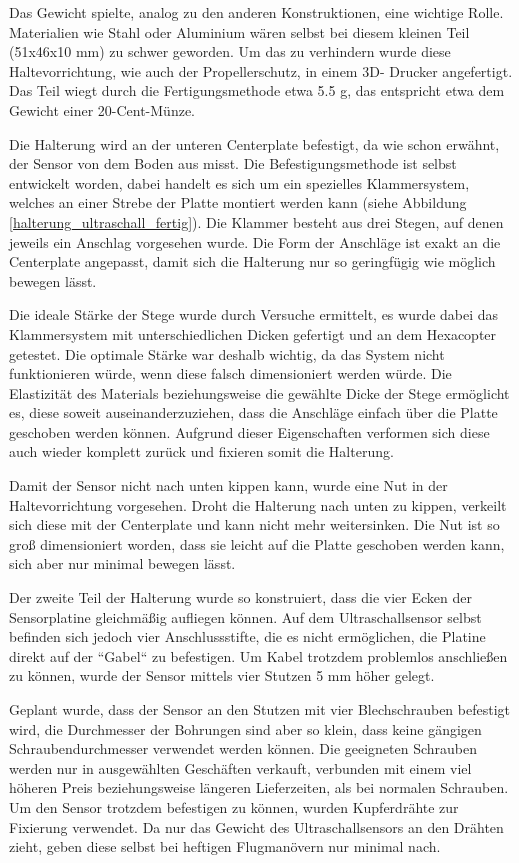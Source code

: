 	Das Gewicht spielte, analog zu den anderen Konstruktionen, eine wichtige Rolle.
	Materialien wie Stahl oder Aluminium wären selbst bei diesem kleinen Teil (51x46x10 mm) zu schwer geworden.
	Um das zu verhindern wurde diese Haltevorrichtung, wie auch der Propellerschutz, in einem 3D- Drucker angefertigt.
	Das Teil wiegt durch die Fertigungsmethode etwa 5.5 g, das entspricht etwa dem Gewicht einer 20-Cent-Münze.

			\newpage

	Die Halterung wird an der unteren Centerplate befestigt, da wie schon erwähnt, der Sensor von dem Boden aus misst.
	Die Befestigungsmethode ist selbst entwickelt worden, dabei handelt es sich um ein spezielles Klammersystem, welches an einer Strebe der Platte montiert werden kann (siehe Abbildung \ref{halterung_ultraschall_fertig}).
	Die Klammer besteht aus drei Stegen, auf denen jeweils ein Anschlag vorgesehen wurde.
	Die Form der Anschläge ist  exakt an die Centerplate angepasst, damit sich die Halterung nur so geringfügig wie möglich bewegen lässt.

	Die ideale Stärke der Stege wurde durch Versuche ermittelt, es wurde dabei das Klammersystem mit unterschiedlichen Dicken gefertigt und an dem Hexacopter getestet.
	Die optimale Stärke war deshalb wichtig, da das System nicht funktionieren würde, wenn diese falsch dimensioniert werden würde.
	Die Elastizität des Materials beziehungsweise die gewählte Dicke der Stege ermöglicht es, diese soweit auseinanderzuziehen, dass die Anschläge einfach über die Platte geschoben werden können.
	Aufgrund dieser Eigenschaften verformen sich diese auch wieder komplett zurück und fixieren somit die Halterung.

	Damit der Sensor nicht nach unten kippen kann, wurde eine Nut in der Haltevorrichtung vorgesehen.
	Droht die Halterung nach unten zu kippen, verkeilt sich diese mit der Centerplate und kann nicht mehr weitersinken.
	Die Nut ist so groß dimensioniert worden, dass sie leicht auf die Platte geschoben werden kann, sich aber nur minimal bewegen lässt.

	Der zweite Teil der Halterung wurde so konstruiert, dass die vier Ecken der Sensorplatine gleichmäßig aufliegen können.
	Auf dem Ultraschallsensor selbst befinden sich jedoch vier Anschlussstifte, die es nicht ermöglichen, die Platine direkt auf der “Gabel“ zu befestigen.
	Um Kabel trotzdem problemlos anschließen zu können, wurde der Sensor mittels vier Stutzen 5 mm höher gelegt.

	Geplant wurde, dass der Sensor an den Stutzen mit vier Blechschrauben befestigt wird, die Durchmesser der Bohrungen sind aber so klein, dass keine gängigen Schraubendurchmesser verwendet werden können.
	Die geeigneten Schrauben werden nur in ausgewählten Geschäften verkauft, verbunden mit einem viel höheren Preis beziehungsweise längeren Lieferzeiten, als bei normalen Schrauben.
	Um den Sensor trotzdem befestigen zu können, wurden Kupferdrähte zur Fixierung verwendet.
	Da nur das Gewicht des Ultraschallsensors an den Drähten zieht, geben diese selbst bei heftigen Flugmanövern nur minimal nach.

